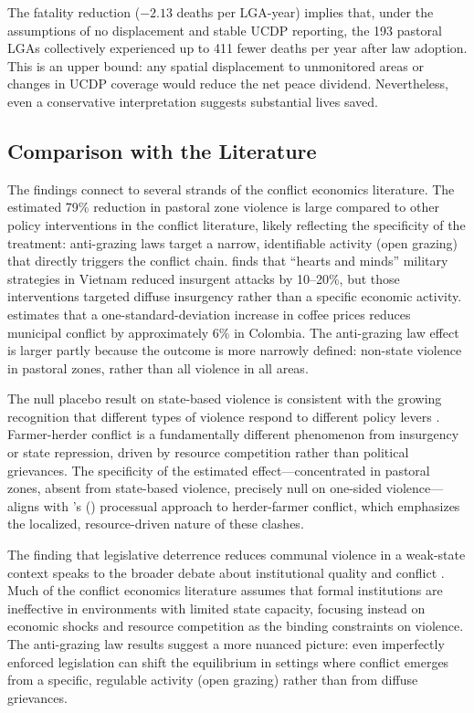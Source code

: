 \documentclass[12pt]{article}
\begin{document}
The fatality reduction ($-2.13$ deaths per LGA-year) implies that, under the assumptions of no displacement and stable UCDP reporting, the 193 pastoral LGAs collectively experienced up to 411 fewer deaths per year after law adoption. This is an upper bound: any spatial displacement to unmonitored areas or changes in UCDP coverage would reduce the net peace dividend. Nevertheless, even a conservative interpretation suggests substantial lives saved.

\subsection{Comparison with the Literature}

The findings connect to several strands of the conflict economics literature. The estimated 79\% reduction in pastoral zone violence is large compared to other policy interventions in the conflict literature, likely reflecting the specificity of the treatment: anti-grazing laws target a narrow, identifiable activity (open grazing) that directly triggers the conflict chain. \citet{dell2018nation} finds that ``hearts and minds'' military strategies in Vietnam reduced insurgent attacks by 10--20\%, but those interventions targeted diffuse insurgency rather than a specific economic activity. \citet{dube2013commodity} estimates that a one-standard-deviation increase in coffee prices reduces municipal conflict by approximately 6\% in Colombia. The anti-grazing law effect is larger partly because the outcome is more narrowly defined: non-state violence in pastoral zones, rather than all violence in all areas.

The null placebo result on state-based violence is consistent with the growing recognition that different types of violence respond to different policy levers \citep{blattman2010civil}. Farmer-herder conflict is a fundamentally different phenomenon from insurgency or state repression, driven by resource competition rather than political grievances. The specificity of the estimated effect---concentrated in pastoral zones, absent from state-based violence, precisely null on one-sided violence---aligns with \citeauthor{moritz2010understanding}'s (\citeyear{moritz2010understanding}) processual approach to herder-farmer conflict, which emphasizes the localized, resource-driven nature of these clashes.

The finding that legislative deterrence reduces communal violence in a weak-state context speaks to the broader debate about institutional quality and conflict \citep{acemoglu2001colonial, north1991institutions}. Much of the conflict economics literature assumes that formal institutions are ineffective in environments with limited state capacity, focusing instead on economic shocks and resource competition as the binding constraints on violence. The anti-grazing law results suggest a more nuanced picture: even imperfectly enforced legislation can shift the equilibrium in settings where conflict emerges from a specific, regulable activity (open grazing) rather than from diffuse grievances.
\end{document}
